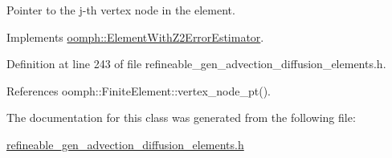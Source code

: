Pointer to the j-\/th vertex node in the element. 



Implements \hyperlink{classoomph_1_1ElementWithZ2ErrorEstimator_a0eedccc33519f852c5dc2055ddf2774b}{oomph\+::\+Element\+With\+Z2\+Error\+Estimator}.



Definition at line 243 of file refineable\+\_\+gen\+\_\+advection\+\_\+diffusion\+\_\+elements.\+h.



References oomph\+::\+Finite\+Element\+::vertex\+\_\+node\+\_\+pt().



The documentation for this class was generated from the following file\+:\begin{DoxyCompactItemize}
\item 
\hyperlink{refineable__gen__advection__diffusion__elements_8h}{refineable\+\_\+gen\+\_\+advection\+\_\+diffusion\+\_\+elements.\+h}\end{DoxyCompactItemize}
